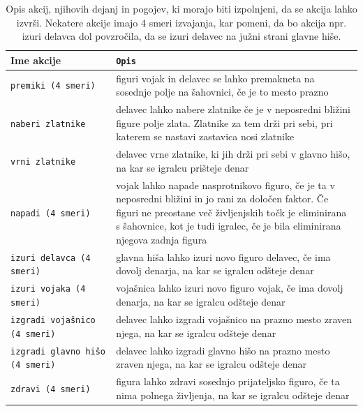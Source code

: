 \documentclass[a4paper, 12pt]{book}
\begin{document}
\begin{table}
	\begin{center}
		\begin{tabular}{p{0.3\linewidth}|p{0.7\linewidth}}
			Ime akcije                          & {\tt Opis} \\ \hline
			{\tt premiki (4 smeri)}             & figuri vojak in delavec se lahko premakneta na sosednje polje na šahovnici, če je to mesto prazno \\
			{\tt naberi zlatnike}               & delavec lahko nabere zlatnike če je v neposredni bližini figure polje zlata. Zlatnike za tem drži pri sebi, pri katerem se nastavi zastavica nosi zlatnike\\
			{\tt vrni zlatnike}                 & delavec vrne zlatnike, ki jih drži pri sebi v glavno hišo, na kar se igralcu prišteje denar \\
			{\tt napadi (4 smeri)}              & vojak lahko napade nasprotnikovo figuro, če je ta v neposredni bližini in jo rani za določen faktor. Če figuri ne preostane več življenjskih točk je eliminirana s šahovnice, kot je tudi igralec, če je bila eliminirana njegova zadnja figura \\
			{\tt izuri delavca (4 smeri)}       & glavna hiša lahko izuri novo figuro delavec, če ima dovolj denarja, na kar se igralcu odšteje denar\\
			{\tt izuri vojaka (4 smeri)}        & vojašnica lahko izuri novo figuro vojak, če ima dovolj denarja, na kar se igralcu odšteje denar \\
			{\tt izgradi vojašnico (4 smeri)}   & delavec lahko izgradi vojašnico na prazno mesto zraven njega, na kar se igralcu odšteje denar \\
			{\tt izgradi glavno hišo (4 smeri)} & delavec lahko izgradi glavno hišo na prazno mesto zraven njega, na kar se igralcu odšteje denar \\
			{\tt zdravi (4 smeri)}              & figura lahko zdravi sosednjo prijateljsko figuro, če ta nima polnega življenja, na kar se igralcu odšteje denar\\
		\end{tabular}
	\end{center}
	\caption{Opis akcij, njihovih dejanj in pogojev, ki morajo biti izpolnjeni, da se akcija lahko izvrši. Nekatere akcije imajo 4 smeri izvajanja, kar pomeni, da bo akcija npr. izuri delavca dol povzročila, da se izuri delavec na južni strani glavne hiše.}
	\label{tableActions}
\end{table}
\end{document}
